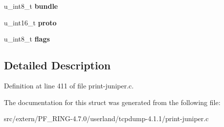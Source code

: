 \begin{DoxyCompactItemize}
\item 
\hypertarget{structjuniper__l2info__t_a13f9b43e5a6224b9675520fad11c18cb}{
u\_\-int8\_\-t {\bfseries bundle}}
\label{structjuniper__l2info__t_a13f9b43e5a6224b9675520fad11c18cb}

\item 
\hypertarget{structjuniper__l2info__t_a54c75458fab0bd7fefe375aaa601679b}{
u\_\-int16\_\-t {\bfseries proto}}
\label{structjuniper__l2info__t_a54c75458fab0bd7fefe375aaa601679b}

\item 
\hypertarget{structjuniper__l2info__t_ac575d72a4a4bf171b33abb0a040f74ba}{
u\_\-int8\_\-t {\bfseries flags}}
\label{structjuniper__l2info__t_ac575d72a4a4bf171b33abb0a040f74ba}

\end{DoxyCompactItemize}


\subsection{Detailed Description}


Definition at line 411 of file print-\/juniper.c.



The documentation for this struct was generated from the following file:\begin{DoxyCompactItemize}
\item 
src/extern/PF\_\-RING-\/4.7.0/userland/tcpdump-\/4.1.1/print-\/juniper.c\end{DoxyCompactItemize}
